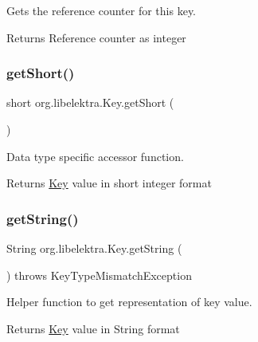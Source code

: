 Gets the reference counter for this key. 

\begin{DoxyReturn}{Returns}
Reference counter as integer 
\end{DoxyReturn}
\mbox{\label{classorg_1_1libelektra_1_1Key_a51754727fad0f4f9a540226ec329c74b}} 
\subsubsection{\texorpdfstring{get\+Short()}{getShort()}}
{\footnotesize\ttfamily short org.\+libelektra.\+Key.\+get\+Short (\begin{DoxyParamCaption}{ }\end{DoxyParamCaption})\hspace{0.3cm}{\ttfamily [inline]}}



Data type specific accessor function. 

\begin{DoxyReturn}{Returns}
\hyperlink{classorg_1_1libelektra_1_1Key}{Key} value in short integer format 
\end{DoxyReturn}
\mbox{\label{classorg_1_1libelektra_1_1Key_a3464485c19d49b6763f6c831cf5ed06c}} 
\subsubsection{\texorpdfstring{get\+String()}{getString()}}
{\footnotesize\ttfamily String org.\+libelektra.\+Key.\+get\+String (\begin{DoxyParamCaption}{ }\end{DoxyParamCaption}) throws Key\+Type\+Mismatch\+Exception\hspace{0.3cm}{\ttfamily [inline]}}



Helper function to get representation of key value. 

\begin{DoxyReturn}{Returns}
\hyperlink{classorg_1_1libelektra_1_1Key}{Key} value in String format 
\end{DoxyReturn}

